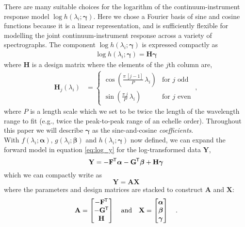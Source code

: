 \documentclass[modern]{aastex631}
\renewcommand{\vec}[1]{\mathbf{#1}}
\newcommand{\vecalpha}{\boldsymbol{\alpha}}
\newcommand{\vecbeta}{\boldsymbol{\beta}}
\newcommand{\vecgamma}{\boldsymbol{\gamma}}
\newcommand*{\transpose}{^{\mkern-1.5mu\mathsf{T}}}
\begin{document}
There are many suitable choices for the logarithm of the continuum-instrument response model $\log{h(\lambda_i;\vecgamma)}$. Here we chose a Fourier basis of sine and cosine functions because it is a linear representation, and is sufficiently flexible for modelling the joint continuum-instrument response across a variety of spectrographs. The component $\log{h(\lambda_i;\vecgamma)}$ is expressed compactly as
\begin{align}
    \log{h(\lambda_i;\vecgamma)} = \vec{H}\vecgamma
\end{align}
where $\vec{H}$ is a design matrix where the elements of the $j$th column are, %
\begin{align}
    \vec{H}_{j}(\lambda_i) & = \left\{\begin{array}{cl}\displaystyle\cos\left(\frac{\pi\,[j-1]}{P}\,\lambda_i\right) & \mbox{for $j$ odd} \\[3ex]
    \displaystyle\sin\left(\frac{\pi\,j}{P}\,\lambda_i\right) & \mbox{for $j$ even}\end{array}\right. ~,
\end{align}
\noindent{}where $P$ is a length scale which we set to be twice the length of the wavelength range to fit (e.g., twice the peak-to-peak range of an echelle order). %
Throughout this paper we will describe $\vecgamma$ as the sine-and-cosine \emph{coefficients}.\\

\noindent{}With $f(\lambda_i;\vecalpha)$, $g(\lambda_i;\vecbeta)$ and $h(\lambda_i;\vecgamma)$ now defined, we can expand the forward model in equation \ref{eq:log_y} for the log-transformed data $\vec{Y}$,
\begin{equation}
    \vec{Y} = -\vec{F}\transpose\vecalpha - \vec{G}\transpose\vecbeta + \vec{H}\vecgamma
\end{equation}
\noindent{}which we can compactly write as
\begin{equation}
    \vec{Y} = \vec{A}\vec{X}
\end{equation}
where the parameters and design matrices are stacked to construct $\vec{A}$ and $\vec{X}$:
\begin{eqnarray}
    \vec{A} = \begin{bmatrix}-\vec{F}\transpose\\-\vec{G}\transpose\\\vec{H}\end{bmatrix}
    \quad \mbox{and} \quad
    \vec{X} = \begin{bmatrix}\vecalpha\\\vecbeta\\\vecgamma\end{bmatrix} \quad .
\end{eqnarray}
\end{document}
